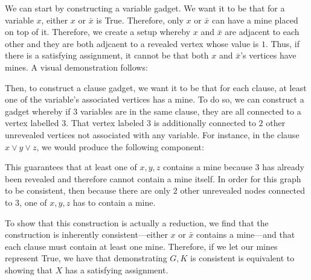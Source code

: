 \documentclass[11pt, reqno]{amsart}
\theoremstyle{plain}
\theoremstyle{definition}
\newcounter{r}
\begin{document}
\begin{enumerate}
    We can start by constructing a variable gadget. We want it to be that for a
    variable $x$, either $x$ or $\bar{x}$ is True. Therefore, only $x$ or
    $\bar{x}$ can have a mine placed on top of it. Therefore, we create a setup
    whereby $x$ and $\bar{x}$ are adjacent to each other and they are both
    adjcaent to a revealed vertex whose value is $1$. Thus, if there is a
    satisfying assignment, it cannot be that both $x$ and $\bar{x}$'s vertices
    have mines. A visual demonstration follows:
    \begin{center}
    \end{center}
    Then, to construct a clause gadget, we want it to be that for each clause,
    at least one of the variable's associated vertices has a mine. To do so, we
    can construct a gadget whereby if $3$ variables are in the same clause,
    they are all connected to a vertex labelled $3$. That vertex labeled $3$ is
    additionally connected to $2$ other unrevealed vertices not associated with
    any variable. For instance, in the clause $x\lor y\lor z$, we would produce
    the following component:
    \begin{center}
    \end{center}
    This guarantees that at least one of $x, y, z$ contains a mine because $3$
    has already been revealed and therefore cannot contain a mine itself. In
    order for this graph to be consistent, then because there are only $2$
    other unrevealed nodes connected to $3$, one of $x, y, z$ has to contain a
    mine.

    To show that this construction is actually a reduction, we find that the
    construction is inherently consistent---either $x$ or $\bar{x}$ contains a
    mine---and that each clause must contain at least one mine. Therefore, if
    we let our mines represent True, we have that demonstrating $G, K$ is
    consistent is equivalent to showing that $X$ has a satisfying assignment.


\end{enumerate}
\end{document}
